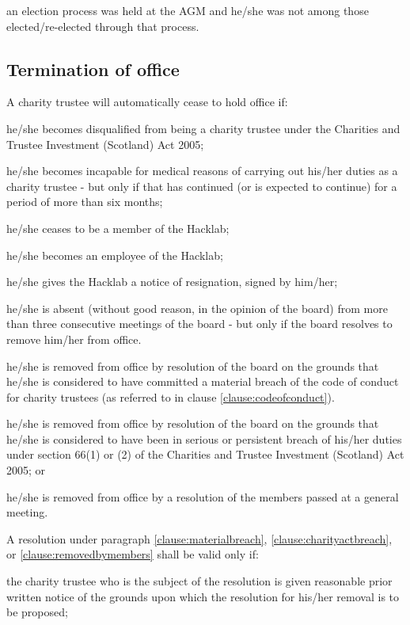 \documentclass{article}
\begin{document}
\subclause an election process was held at the AGM and he/she was not
among those elected/re-elected through that process.

\subsection{Termination of office}

\clause A charity trustee will automatically cease to hold office if:

\subclause he/she becomes disqualified from being a charity trustee
under the Charities and Trustee Investment (Scotland) Act 2005;

\subclause he/she becomes incapable for medical reasons of carrying
out his/her duties as a charity trustee - but only if that has
continued (or is expected to continue) for a period of more than six
months;

\subclause he/she ceases to be a member of the Hacklab;

\subclause he/she becomes an employee of the Hacklab;

\subclause he/she gives the Hacklab a notice of resignation, signed by
him/her;

\subclause he/she is absent (without good reason, in the opinion of
the board) from more than three consecutive meetings of the board -
but only if the board resolves to remove him/her from office.

\subclause\label{clause:materialbreach}he/she is removed from office by resolution of the board on
the grounds that he/she is considered to have committed a material
breach of the code of conduct for charity trustees (as referred to in
clause \ref{clause:codeofconduct}).

\subclause\label{clause:charityactbreach}he/she is removed from office by resolution of the board
on the grounds that he/she is considered to have been in serious or
persistent breach of his/her duties under section 66(1) or (2) of the
Charities and Trustee Investment (Scotland) Act 2005; or

\subclause\label{clause:removedbymembers}he/she is removed from office by a resolution of the
members passed at a general meeting.

\clause A resolution under paragraph \ref{clause:materialbreach},
\ref{clause:charityactbreach}, or \ref{clause:removedbymembers} shall
be valid only if:

\subclause the charity trustee who is the subject of the resolution is
given reasonable prior written notice of the grounds upon which the
resolution for his/her removal is to be proposed;
\end{document}
